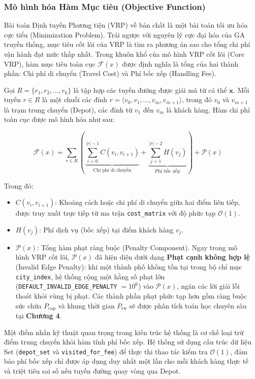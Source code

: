 \documentclass[12pt,a4paper]{article}
\numberwithin{figure}{subsection}
\numberwithin{table}{subsection}
\begin{document}
\subsubsection{Mô hình hóa Hàm Mục tiêu (Objective Function)}

Bài toán Định tuyến Phương tiện (VRP) về bản chất là một bài toán tối ưu hóa cực tiểu (Minimization Problem). Trái ngược với nguyên lý cực đại hóa của GA truyền thống, mục tiêu cốt lõi của VRP là tìm ra phương án sao cho tổng chi phí vận hành đạt mức thấp nhất. Trong khuôn khổ của mô hình VRP cốt lõi (Core VRP), hàm mục tiêu toàn cục $\mathcal{F}(x)$ được định nghĩa là tổng của hai thành phần: Chi phí di chuyển (Travel Cost) và Phí bốc xếp (Handling Fee).

Gọi $R = \{r_1, r_2, \dots, r_k\}$ là tập hợp các tuyến đường được giải mã từ cá thể $\textbf{x}$. Mỗi tuyến $r \in R$ là một chuỗi các đỉnh $r = \langle v_0, v_1, \dots, v_m, v_{m+1} \rangle$, trong đó $v_0$ và $v_{m+1}$ là trạm trung chuyển (Depot), các đỉnh từ $v_1$ đến $v_m$ là khách hàng. Hàm chi phí toàn cục được mô hình hóa như sau:

\[ \mathcal{F}(x) = \sum_{r \in R} \left( \underbrace{\sum_{i=0}^{|r|-1} C(v_i, v_{i+1})}_{\text{Chi phí di chuyển}} + \underbrace{\sum_{j=1}^{|r|-2} H(v_j)}_{\text{Phí bốc xếp}} \right) + \mathcal{P}(x) \]

Trong đó:
\begin{itemize}[label={ $\circ$}, leftmargin=1.5cm]
    \item $C(v_i, v_{i+1})$: Khoảng cách hoặc chi phí di chuyển giữa hai điểm liên tiếp, được truy xuất trực tiếp từ ma trận \texttt{cost\_matrix} với độ phức tạp $\mathcal{O}(1)$.
    \item $H(v_j)$: Phí dịch vụ (bốc xếp) tại điểm khách hàng $v_j$. 
    \item $\mathcal{P}(x)$: Tổng hàm phạt ràng buộc (Penalty Component). Ngay trong mô hình VRP cốt lõi, $\mathcal{P}(x)$ đã hiện diện dưới dạng \textbf{Phạt cạnh không hợp lệ} (Invalid Edge Penalty): khi một thành phố không tồn tại trong bộ chỉ mục \texttt{city\_index}, hệ thống cộng một hằng số phạt lớn (\texttt{DEFAULT\_INVALID\_EDGE\_PENALTY} $= 10^6$) vào $\mathcal{P}(x)$, ngăn các lời giải lỗi thoát khỏi vùng bị phạt. Các thành phần phạt phức tạp hơn gồm ràng buộc sức chứa $P_{\text{cap}}$ và khung thời gian $P_{\text{tw}}$ sẽ được phân tích toán học chuyên sâu tại \textbf{Chương 4}.
\end{itemize}

Một điểm nhấn kỹ thuật quan trọng trong kiến trúc hệ thống là cơ chế loại trừ điểm trung chuyển khỏi hàm tính phí bốc xếp. Hệ thống sử dụng cấu trúc dữ liệu Set (\texttt{depot\_set} và \texttt{visited\_for\_fee}) để thực thi thao tác kiểm tra $\mathcal{O}(1)$, đảm bảo phí bốc xếp chỉ được áp dụng duy nhất một lần cho mỗi khách hàng thực tế và triệt tiêu sai số nếu tuyến đường quay vòng qua Depot.
\end{document}
